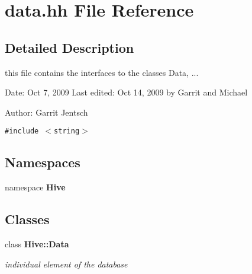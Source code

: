 \section{data.hh File Reference}
\label{data_8hh}


\subsection{Detailed Description}
this file contains the interfaces to the classes Data, ...

\begin{Desc}
\item[Date:]Oct 7, 2009 Last edited: Oct 14, 2009 by Garrit and Michael\end{Desc}
\begin{Desc}
\item[Author:]Garrit Jentsch \end{Desc}


{\tt \#include $<$string$>$}\par
\subsection*{Namespaces}
\begin{CompactItemize}
\item 
namespace {\bf Hive}
\end{CompactItemize}
\subsection*{Classes}
\begin{CompactItemize}
\item 
class {\bf Hive::Data}
\begin{CompactList}\small\item\em individual element of the database \item\end{CompactList}\end{CompactItemize}
